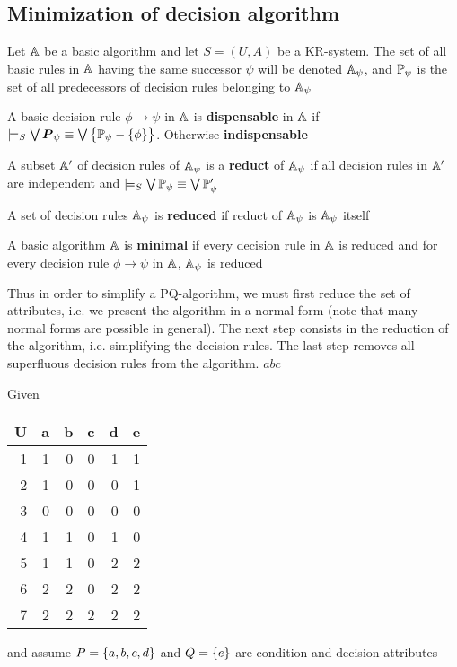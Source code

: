 \documentclass[11pt]{article}
\begin{document}
\subsection{Minimization of decision algorithm}
\label{sec:orgafbffb6}
Let \(\A\) be a basic algorithm and let \(S=(U,A)\) be a KR-system. The set of all
basic rules in \(\A\) having the same successor \(\psi\) will be denoted
\(\A_\psi\), and \(\P_\psi\) is the set of all predecessors of decision rules
belonging to \(\A_\psi\)

A basic decision rule \(\phi\to\psi\) in \(\A\) is \textbf{dispensable} in \(\A\) if
\(\models_S\bigvee\bP_\psi\equiv\bigvee\lb\P_\psi-\lb\phi\rb\rb\). Otherwise
\textbf{indispensable}

A subset \(\A'\) of decision rules of \(\A_\psi\) is a \textbf{reduct} of \(\A_\psi\) if all
decision rules in \(\A'\) are independent and
\(\models_S\bigvee\P_\psi\equiv\bigvee\P'_\psi\) 

A set of decision rules \(\A_\psi\) is \textbf{reduced} if reduct of \(\A_\psi\) is
\(\A_\psi\) itself

A basic algorithm \(\A\) is \textbf{minimal} if every decision rule in \(\A\) is reduced
and for every decision rule \(\phi\to\psi\) in \(\A\), \(\A_\psi\) is reduced

Thus in order to simplify a PQ-algorithm, we must first reduce the set of
attributes, i.e. we present the algorithm in a normal form (note that many
normal forms are possible in general). The next step consists in the reduction
of the algorithm, i.e. simplifying the decision rules. The last step removes
all superfluous decision rules from the algorithm.
$abc$

Given
\begin{center}
\begin{tabular}{rrrrrr}
U & a & b & c & d & e\\
\hline
1 & 1 & 0 & 0 & 1 & 1\\
2 & 1 & 0 & 0 & 0 & 1\\
3 & 0 & 0 & 0 & 0 & 0\\
4 & 1 & 1 & 0 & 1 & 0\\
5 & 1 & 1 & 0 & 2 & 2\\
6 & 2 & 2 & 0 & 2 & 2\\
7 & 2 & 2 & 2 & 2 & 2\\
\end{tabular}
\end{center}
and assume \(P=\lb a,b,c,d\rb\) and \(Q=\lb e\rb\) are condition and decision attributes
\end{document}
